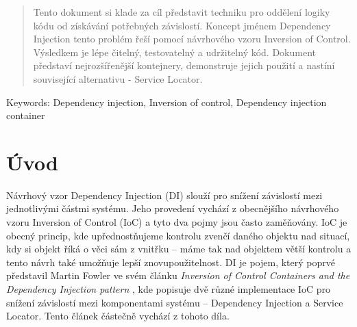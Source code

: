 \documentclass[a4paper,conference]{IEEEtran}
\begin{document}
\begin{abstract}
Tento dokument si klade za cíl představit techniku pro oddělení logiky kódu od získávání potřebných závislostí. Koncept jménem Dependency Injection tento problém řeší pomocí návrhového vzoru Inversion of Control. Výsledkem je lépe čitelný, testovatelný a udržitelný kód. Dokument představí nejrozšířenější kontejnery, demonstruje jejich použití a nastíní související alternativu - Service Locator.
\end{abstract}











\begin{IEEEkeywords}
Keywords: Dependency injection, Inversion of control, Dependency injection container
\end{IEEEkeywords}


%
\IEEEpeerreviewmaketitle



\section{Úvod}
Návrhový vzor Dependency Injection (DI) slouží pro snížení závislostí mezi jednotlivými částmi systému. Jeho provedení vychází z obecnějšího návrhového vzoru Inversion of Control (IoC) a tyto dva pojmy jsou často zaměňovány.
IoC je obecný princip, kde upřednostňujeme kontrolu zvenčí daného objektu nad situací, kdy si objekt říká o věci sám z vnitřku – máme tak nad objektem větší kontrolu a tento návrh také umožňuje lepší znovupoužitelnost.
DI je pojem, který poprvé představil Martin Fowler ve svém článku \emph{Inversion of Control Containers and the Dependency Injection pattern} \cite{Inversion of Control Containers and the Dependency Injection pattern}, kde popisuje dvě různé implementace IoC pro snížení závislostí mezi komponentami systému – Dependency Injection a Service Locator. Tento článek částečně vychází z tohoto díla.
\end{document}
